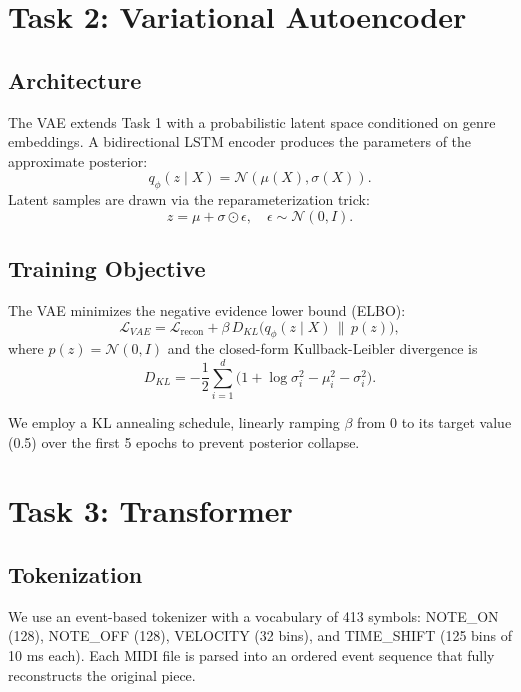 \documentclass[conference]{IEEEtran}
\begin{document}
\section{Task 2: Variational Autoencoder} \label{sec:task2}

\subsection{Architecture}
The VAE extends Task 1 with a probabilistic latent space conditioned on
genre embeddings. A bidirectional LSTM encoder produces the parameters of
the approximate posterior:
\begin{equation}
q_\phi(z \mid X) = \mathcal{N}(\mu(X), \sigma(X)).
\end{equation}
Latent samples are drawn via the reparameterization trick:
\begin{equation}
z = \mu + \sigma \odot \epsilon, \quad \epsilon \sim \mathcal{N}(0, I).
\end{equation}

\subsection{Training Objective}
The VAE minimizes the negative evidence lower bound (ELBO):
\begin{equation}
\mathcal{L}_{VAE} = \mathcal{L}_{\text{recon}} + \beta \, D_{KL}\bigl(q_\phi(z \mid X) \,\|\, p(z)\bigr),
\end{equation}
where $p(z) = \mathcal{N}(0, I)$ and the closed-form Kullback-Leibler
divergence is
\begin{equation}
D_{KL} = -\frac{1}{2} \sum_{i=1}^{d}\bigl(1 + \log \sigma_i^2 - \mu_i^2 - \sigma_i^2\bigr).
\end{equation}

We employ a KL annealing schedule, linearly ramping $\beta$ from 0 to its
target value (0.5) over the first 5 epochs to prevent posterior collapse.

\section{Task 3: Transformer} \label{sec:task3}

\subsection{Tokenization}
We use an event-based tokenizer with a vocabulary of 413 symbols:
NOTE\_ON (128), NOTE\_OFF (128), VELOCITY (32 bins), and TIME\_SHIFT (125
bins of 10 ms each). Each MIDI file is parsed into an ordered event
sequence that fully reconstructs the original piece.
\end{document}
